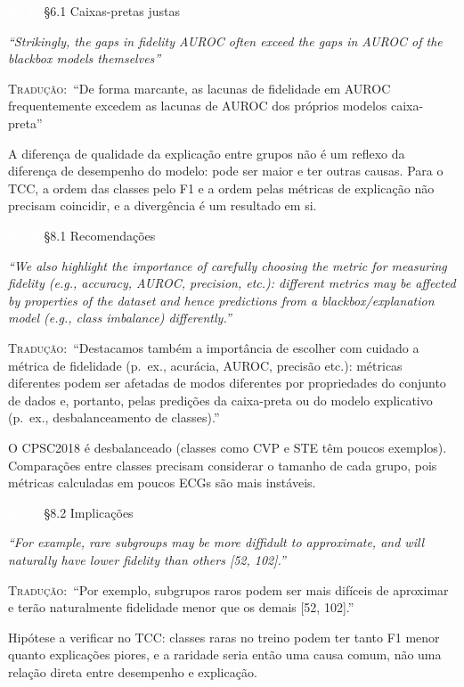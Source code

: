 \documentclass[11pt,a4paper]{article}
\newcommand{\pagechip}[1]{{\setlength{\fboxsep}{1.5pt}\colorbox{cAcc}{\textcolor{white}{\scriptsize\texttt{#1}}}}}
\newenvironment{origquote}{\par\itshape\small}{\par}
\newenvironment{tradquote}{\par\small\textsc{Tradução:}\ }{\par}
\newcommand{\explab}[1]{\par\smallskip{\small\color{cAcc}\textbf{\MakeUppercase{#1}}}\par}
\begin{document}
\begin{citacard}{\pagechip{p. 11} §6.1 Caixas-pretas justas}
\begin{origquote}“Strikingly, the gaps in fidelity AUROC often exceed the gaps in AUROC of the blackbox models themselves”\end{origquote}
\begin{tradquote}“De forma marcante, as lacunas de fidelidade em AUROC frequentemente excedem as lacunas de AUROC dos próprios modelos caixa-preta”\end{tradquote}
\explab{Explicação}
A diferença de qualidade da explicação entre grupos não é um reflexo da diferença de desempenho do modelo: pode ser maior e ter outras causas. Para o TCC, a ordem das classes pelo F1 e a ordem pelas métricas de explicação não precisam coincidir, e a divergência é um resultado em si.
\end{citacard}

\begin{citacard}{\pagechip{p. 14} §8.1 Recomendações}
\begin{origquote}“We also highlight the importance of carefully choosing the metric for measuring fidelity (e.g., accuracy, AUROC, precision, etc.): different metrics may be affected by properties of the dataset and hence predictions from a blackbox/explanation model (e.g., class imbalance) differently.”\end{origquote}
\begin{tradquote}“Destacamos também a importância de escolher com cuidado a métrica de fidelidade (p.~ex., acurácia, AUROC, precisão etc.): métricas diferentes podem ser afetadas de modos diferentes por propriedades do conjunto de dados e, portanto, pelas predições da caixa-preta ou do modelo explicativo (p.~ex., desbalanceamento de classes).”\end{tradquote}
\explab{Explicação}
O CPSC2018 é desbalanceado (classes como CVP e STE têm poucos exemplos). Comparações entre classes precisam considerar o tamanho de cada grupo, pois métricas calculadas em poucos ECGs são mais instáveis.
\end{citacard}

\begin{citacard}{\pagechip{p. 15} §8.2 Implicações}
\begin{origquote}“For example, rare subgroups may be more diffidult to approximate, and will naturally have lower fidelity than others [52, 102].”\end{origquote}
\begin{tradquote}“Por exemplo, subgrupos raros podem ser mais difíceis de aproximar e terão naturalmente fidelidade menor que os demais [52, 102].”\end{tradquote}
\explab{Explicação}
Hipótese a verificar no TCC: classes raras no treino podem ter tanto F1 menor quanto explicações piores, e a raridade seria então uma causa comum, não uma relação direta entre desempenho e explicação.
\end{citacard}
\end{document}

